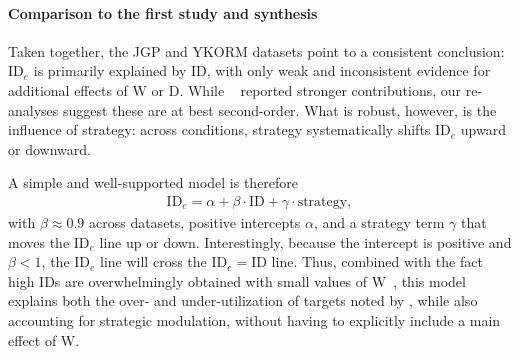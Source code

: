 \documentclass[acmlarge, manuscript,review]{acmart}
\newcommand{\ide}{\ensuremath{{\text{ID}_e}}\xspace}
\begin{document}
\paragraph{Comparison to the first study and synthesis}
Taken together, the JGP and YKORM datasets point to a consistent conclusion: \ide is primarily explained by ID, with only weak and inconsistent evidence for additional effects of W or D. While \citeauthor{zhai2004nominal}~\cite{zhai2004nominal} reported stronger contributions, our re-analyses suggest these are at best second-order. What is robust, however, is the influence of strategy: across conditions, strategy systematically shifts \ide upward or downward.

A simple and well-supported model is therefore
\begin{align}
\ide = \alpha + \beta\cdot{}\text{ID} + \gamma\cdot{}\text{strategy}, \label{eq:model_ide_simple}
\end{align}
with $\beta \approx 0.9$ across datasets, positive intercepts $\alpha$, and a strategy term $\gamma$ that moves the \ide line up or down. 
Interestingly, because the intercept is positive and $\beta < 1$, the \ide line will cross the $\ide = \text{ID}$ line. Thus, combined with the fact high IDs are overwhelmingly obtained with small values of W~\cite{gori2018chi,guiard2009}, this model explains both the over- and under-utilization of targets noted by \citeauthor{zhai2004nominal}, while also accounting for strategic modulation, without having to explicitly include a main effect of W.



\end{document}
